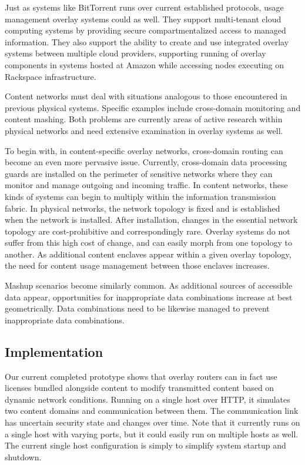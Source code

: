 Just as systems like BitTorrent runs over current established protocols, usage management overlay systems could as well.  They support multi-tenant cloud computing systems by providing secure compartmentalized access to managed information.  They also support the ability to create and use integrated overlay systems between multiple cloud providers, supporting running of overlay components in systems hosted at Amazon while accessing nodes executing on Rackspace infrastructure.

Content networks must deal with situations analogous to those encountered in previous physical systems.  Specific examples include cross-domain monitoring and content mashing.  Both problems are currently areas of active research within physical networks and need extensive examination in overlay systems as well.

To begin with, in content-specific overlay networks, cross-domain routing can become an even more pervasive issue.  Currently, cross-domain data processing guards are installed on the perimeter of sensitive networks where they can monitor and manage outgoing and incoming traffic.  In content networks, these kinds of systems can begin to multiply within the information transmission fabric.  In physical networks, the network topology is fixed and is established when the network is installed.  After installation, changes in the essential network topology are cost-prohibitive and correspondingly rare.  Overlay systems do not suffer from this high cost of change, and can easily morph from one topology to another.  As additional content enclaves appear within a given overlay topology, the need for content usage management between those enclaves increases.

Mashup scenarios become similarly common.  As additional sources of accessible data appear, opportunities for inappropriate data combinations increase at best geometrically.  Data combinations need to be likewise managed to prevent inappropriate data combinations.

\subsection{Implementation}
Our current completed prototype shows that overlay routers can in fact use licenses bundled alongside content to modify transmitted content based on dynamic network conditions.  Running on a single host over HTTP, it simulates two content domains and communication between them.  The communication link has uncertain security state and changes over time.  Note that it currently runs on a single host with varying ports, but it could easily run on multiple hosts as well.  The current single host configuration is simply to simplify system startup and shutdown.


